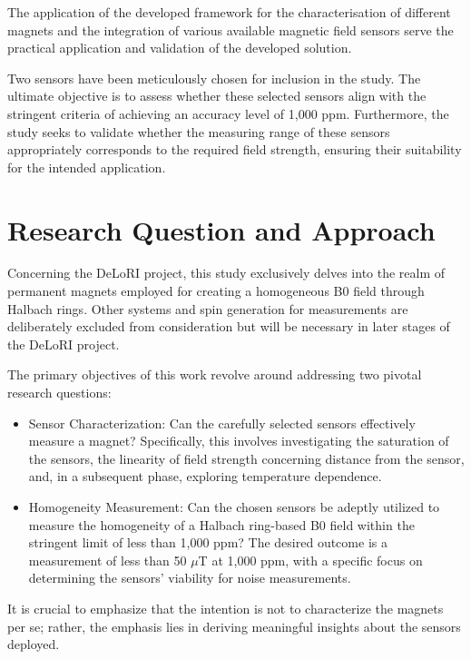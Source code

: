 The application of the developed framework for the characterisation of
different magnets and the integration of various available magnetic
field sensors serve the practical application and validation of the
developed solution.

Two sensors have been meticulously chosen for inclusion in the study.
The ultimate objective is to assess whether these selected sensors align
with the stringent criteria of achieving an accuracy level of 1,000 ppm.
Furthermore, the study seeks to validate whether the measuring range of
these sensors appropriately corresponds to the required field strength,
ensuring their suitability for the intended application.

\hypertarget{research-question-and-approach}{%
\section{Research Question and
Approach}\label{research-question-and-approach}}

Concerning the DeLoRI project, this study exclusively delves into the
realm of permanent magnets employed for creating a homogeneous B0 field
through Halbach rings. Other systems and spin generation for
measurements are deliberately excluded from consideration but will be
necessary in later stages of the DeLoRI project.

The primary objectives of this work revolve around addressing two
pivotal research questions:

\begin{itemize}
\item
  Sensor Characterization: Can the carefully selected sensors
  effectively measure a magnet? Specifically, this involves
  investigating the saturation of the sensors, the linearity of field
  strength concerning distance from the sensor, and, in a subsequent
  phase, exploring temperature dependence.
\item
  Homogeneity Measurement: Can the chosen sensors be adeptly utilized to
  measure the homogeneity of a Halbach ring-based B0 field within the
  stringent limit of less than 1,000 ppm? The desired outcome is a
  measurement of less than 50 \(\mu\)T at 1,000 ppm, with a specific
  focus on determining the sensors' viability for noise measurements.
\end{itemize}

It is crucial to emphasize that the intention is not to characterize the
magnets per se; rather, the emphasis lies in deriving meaningful
insights about the sensors deployed.

